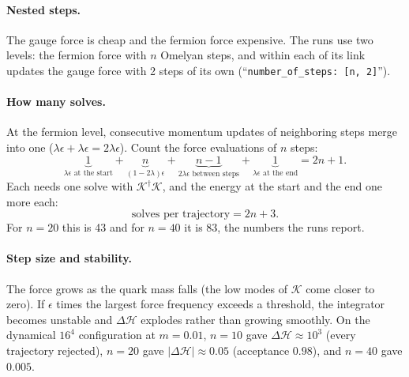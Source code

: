\documentclass[11pt,a4paper]{article}
\numberwithin{equation}{section}
\newcommand{\dg}{^{\dagger}}
\newcommand{\code}[1]{\texttt{\small #1}}
\begin{document}
\paragraph{Nested steps.} The gauge force is cheap and the fermion force expensive. The runs use
two levels: the fermion force with $n$ Omelyan steps, and within each of its link updates the gauge
force with 2 steps of its own (``\code{number\_of\_steps: [n, 2]}'').

\paragraph{How many solves.} At the fermion level, consecutive momentum updates of neighboring
steps merge into one ($\lambda\epsilon+\lambda\epsilon=2\lambda\epsilon$). Count the force
evaluations of $n$ steps:
\begin{equation}
\underbrace{1}_{\lambda\epsilon\text{ at the start}}+\underbrace{n}_{(1-2\lambda)\epsilon}
+\underbrace{n-1}_{2\lambda\epsilon\text{ between steps}}+\underbrace{1}_{\lambda\epsilon\text{ at the end}}
=2n+1 .
\end{equation}
Each needs one solve with $\mathcal K\dg \mathcal K$, and the energy at the start and the end one more each:
\begin{equation}
\text{solves per trajectory}=2n+3 .
\end{equation}
For $n=20$ this is 43 and for $n=40$ it is 83, the numbers the runs report.

\paragraph{Step size and stability.} The force grows as the quark mass falls (the low modes of $\mathcal K$
come closer to zero). If $\epsilon$ times the largest force frequency exceeds a threshold, the
integrator becomes unstable and $\Delta\mathcal H$ explodes rather than growing smoothly. On the
dynamical $16^4$ configuration at $m=0.01$, $n=10$ gave $\Delta\mathcal H\approx10^3$ (every
trajectory rejected), $n=20$ gave $|\Delta\mathcal H|\approx0.05$ (acceptance $0.98$), and
$n=40$ gave $0.005$.
\end{document}
